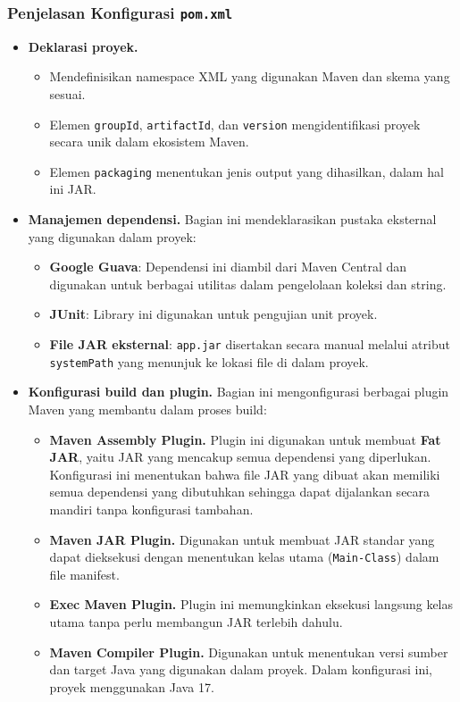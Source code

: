 \subsubsection{Penjelasan Konfigurasi \texttt{pom.xml}}

\begin{itemize}
	\item \textbf{Deklarasi proyek.}  
	\begin{itemize}
		\item Mendefinisikan namespace XML yang digunakan Maven dan skema yang sesuai.
		\item Elemen \texttt{groupId}, \texttt{artifactId}, dan \texttt{version} mengidentifikasi proyek secara unik dalam ekosistem Maven.
		\item Elemen \texttt{packaging} menentukan jenis output yang dihasilkan, dalam hal ini JAR.
	\end{itemize}
	
	\item \textbf{Manajemen dependensi.}  
	Bagian ini mendeklarasikan pustaka eksternal yang digunakan dalam proyek:
	\begin{itemize}
		\item \textbf{Google Guava}: Dependensi ini diambil dari Maven Central dan digunakan untuk berbagai utilitas dalam pengelolaan koleksi dan string.
		\item \textbf{JUnit}: Library ini digunakan untuk pengujian unit proyek.
		\item \textbf{File JAR eksternal}: \texttt{app.jar} disertakan secara manual melalui atribut \texttt{systemPath} yang menunjuk ke lokasi file di dalam proyek.
	\end{itemize}
	
	\item \textbf{Konfigurasi build dan plugin.}  
	Bagian ini mengonfigurasi berbagai plugin Maven yang membantu dalam proses build:
	\begin{itemize}
		\item \textbf{Maven Assembly Plugin.}  
		Plugin ini digunakan untuk membuat \textbf{Fat JAR}, yaitu JAR yang mencakup semua dependensi yang diperlukan. Konfigurasi ini menentukan bahwa file JAR yang dibuat akan memiliki semua dependensi yang dibutuhkan sehingga dapat dijalankan secara mandiri tanpa konfigurasi tambahan.
		
		\item \textbf{Maven JAR Plugin.}  
		Digunakan untuk membuat JAR standar yang dapat dieksekusi dengan menentukan kelas utama (\texttt{Main-Class}) dalam file manifest.
		
		\item \textbf{Exec Maven Plugin.}  
		Plugin ini memungkinkan eksekusi langsung kelas utama tanpa perlu membangun JAR terlebih dahulu.
		
		\item \textbf{Maven Compiler Plugin.}  
		Digunakan untuk menentukan versi sumber dan target Java yang digunakan dalam proyek. Dalam konfigurasi ini, proyek menggunakan Java 17.
	\end{itemize}
\end{itemize}



